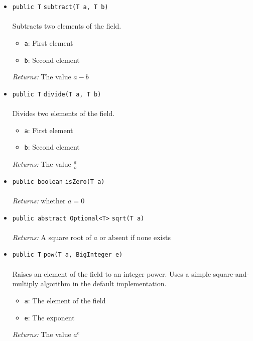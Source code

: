 \begin{itemize}
\item \lstinline|public T| \lstinline|subtract|\lstinline|(T a, T b)|\\ \\[-0.6em]
Subtracts two elements of the field.
\begin{itemize}
\item \lstinline|a|: First element
\item \lstinline|b|: Second element
\end{itemize}

\emph{Returns:} The value $a - b$

\item \lstinline|public T| \lstinline|divide|\lstinline|(T a, T b)|\\ \\[-0.6em]
Divides two elements of the field.
\begin{itemize}
\item \lstinline|a|: First element
\item \lstinline|b|: Second element
\end{itemize}

\emph{Returns:} The value $\frac{a}{b}$

\item \lstinline|public boolean| \lstinline|isZero|\lstinline|(T a)|\\ \\[-0.6em]
\emph{Returns:} whether $a = 0$



\item \lstinline|public abstract Optional<T>| \lstinline|sqrt|\lstinline|(T a)|\\ \\[-0.6em]
\emph{Returns:} A square root of $a$ or absent if none exists



\item \lstinline|public T| \lstinline|pow|\lstinline|(T a, BigInteger e)|\\ \\[-0.6em]
Raises an element of the field to an integer power.
 Uses a simple square-and-multiply algorithm in the default
 implementation.
\begin{itemize}
\item \lstinline|a|: The element of the field
\item \lstinline|e|: The exponent
\end{itemize}

\emph{Returns:} The value $a^e$

\end{itemize}

